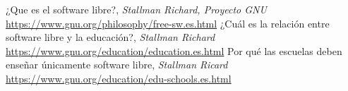 \begin{thebibliography}{99}
 ¿Que es el software libre?, \emph{Stallman Richard, Proyecto GNU} \url{https://www.gnu.org/philosophy/free-sw.es.html}
 ¿Cuál es la relación entre software libre y la educación?, \emph{Stallman Richard} \url{https://www.gnu.org/education/education.es.html}
 Por qué las escuelas deben enseñar únicamente software libre, \emph{Stallman Ricard} \url{https://www.gnu.org/education/edu-schools.es.html}
\end{thebibliography}